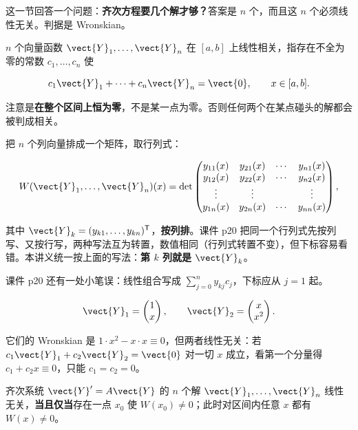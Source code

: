 \documentclass[11pt]{ctexart}
\newcommand{\mat}[1]{\begin{pmatrix}#1\end{pmatrix}}
\begin{document}
这一节回答一个问题：\textbf{齐次方程要几个解才够？}答案是 $n$ 个，而且这 $n$ 个必须线性无关。判据是 Wronskian。


$n$ 个向量函数 $\vect{Y}_1,\dots,\vect{Y}_n$ 在 $[a,b]$ 上线性相关，指存在不全为零的常数 $c_1,\dots,c_n$ 使

\[
c_1\vect{Y}_1+\cdots+c_n\vect{Y}_n=\vect{0},\qquad x\in[a,b].
\]

注意是\textbf{在整个区间上恒为零}，不是某一点为零。否则任何两个在某点碰头的解都会被判成相关。


把 $n$ 个列向量排成一个矩阵，取行列式：

\[
W(\vect{Y}_1,\dots,\vect{Y}_n)(x)=\det\begin{pmatrix}
y_{11}(x) & y_{21}(x) & \cdots & y_{n1}(x)\\
y_{12}(x) & y_{22}(x) & \cdots & y_{n2}(x)\\
\vdots & \vdots & & \vdots\\
y_{1n}(x) & y_{2n}(x) & \cdots & y_{nn}(x)
\end{pmatrix},
\]

其中 $\vect{Y}_k=(y_{k1},\dots,y_{kn})^{\mathsf T}$，\textbf{按列排}。课件 p20 把同一个行列式先按列写、又按行写，两种写法互为转置，数值相同（行列式转置不变），但下标容易看错。本讲义统一按上面的写法：\textbf{第 $k$ 列就是 $\vect{Y}_k$}。

课件 p20 还有一处小笔误：线性组合写成 $\sum_{j=0}^{n}y_{kj}c_j$，下标应从 $j=1$ 起。


\[
\vect{Y}_1=\mat{1\\ x},\qquad \vect{Y}_2=\mat{x\\ x^2}.
\]

它们的 Wronskian 是 $1\cdot x^2-x\cdot x\equiv0$，但两者线性无关：若 $c_1\vect{Y}_1+c_2\vect{Y}_2=\vect{0}$ 对一切 $x$ 成立，看第一个分量得 $c_1+c_2x\equiv0$，只能 $c_1=c_2=0$。



齐次系统 $\vect{Y}'=A\vect{Y}$ 的 $n$ 个解 $\vect{Y}_1,\dots,\vect{Y}_n$ 线性无关，\textbf{当且仅当}存在一点 $x_0$ 使 $W(x_0)\neq0$；此时对区间内任意 $x$ 都有 $W(x)\neq0$。
\end{document}
